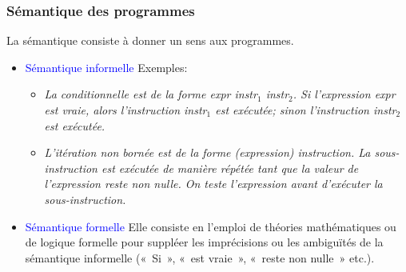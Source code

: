 
%
\begin{frame}
\frametitle{Sémantique des programmes}

La sémantique consiste à donner un sens aux programmes.

\begin{itemize}

  \item \textcolor{blue}{Sémantique informelle} Exemples:

    \begin{itemize}

      \item \emph{La conditionnelle est de la forme
        \Xif \textsf{expr} \Xthen \textsf{instr$_1$}
        \Xelse \textsf{instr$_2$}. Si l'expression \textsf{expr}
        est vraie, alors l'instruction \textsf{instr$_1$} est
        exécutée; sinon l'instruction \textsf{instr$_2$} est
        exécutée.}

      \item \emph{L'itération non bornée est de la forme
        \Xwhile \textsf{(expression) instruction}. La
        sous-instruction est exécutée de manière répétée tant que la
        valeur de l'expression reste non nulle. On teste l'expression
        avant d'exécuter la sous-instruction.}

    \end{itemize}

  \item \textcolor{blue}{Sémantique formelle} Elle consiste en
    l'emploi de théories mathématiques ou de logique formelle pour
    suppléer les imprécisions ou les ambiguïtés de la sémantique
    informelle («~Si~», «~est vraie~», «~reste non nulle~» etc.).

\end{itemize}

\end{frame}

